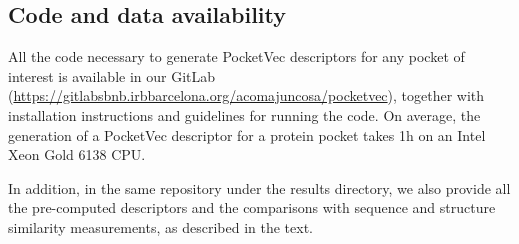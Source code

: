 \subsection{Code and data availability}
\label{PocketVec_Code}

All the code necessary to generate PocketVec descriptors for any pocket of interest is available in our GitLab (\href{https://gitlabsbnb.irbbarcelona.org/acomajuncosa/pocketvec}{https://gitlabsbnb.irbbarcelona.org/acomajuncosa/pocketvec}), together with installation instructions and guidelines for running the code. On average, the generation of a PocketVec descriptor for a protein pocket takes 1h on an Intel Xeon Gold 6138 CPU.

In addition, in the same repository under the results directory, we also provide all the pre-computed descriptors and the comparisons with sequence and structure similarity measurements, as described in the text.


